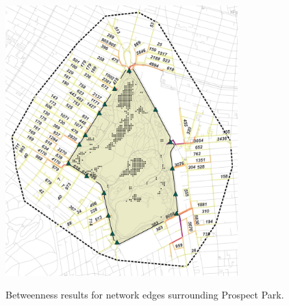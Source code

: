 \newpage
\null
\vfill
\begin{figure}[H]
  \centering
  \captionsetup{width=0.8\textwidth}
  \includegraphics[width=0.8\textwidth]{images/network/prospect_betweenness_roads.png} \\
  \vspace{10pt}
  \caption[Prospect Park - betweenness]{Betweenness results for network edges surrounding Prospect Park.}
  \label{fig:prospect_betweenness_roads}
\end{figure}

